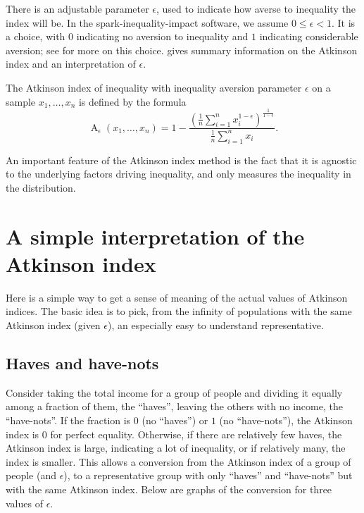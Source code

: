 \documentclass[11pt, oneside]{article}  %
\DeclareMathOperator{\Atkinson}{A}
\begin{document}
There is an adjustable parameter $\epsilon$, used to indicate how averse to inequality the index will be.  In the spark-inequality-impact software, we assume $0 \le \epsilon < 1$.  It is a choice, with $0$ indicating no aversion to inequality and $1$ indicating considerable aversion; see \cite{SaintJacques} for more on this choice.  \cite{AtkinsonWiki} gives summary information on the Atkinson index and an interpretation of $\epsilon$.

The Atkinson index of inequality with inequality aversion parameter \(\epsilon \) on a sample \(x_1, \ldots, x_n\) is defined by the formula
\[ \Atkinson_\epsilon (x_1, \ldots, x_n) = 1 - \frac{(\frac{1}{n}\sum_{i=1}^n x_i^{1-\epsilon})^\frac{1}{1-\epsilon}}{\frac{1}{n}\sum_{i=1}^n x_i}.\]

An important feature of the Atkinson index method is the fact that it is agnostic to the underlying factors driving inequality, and only measures the inequality in the distribution.

\section{A simple interpretation of the Atkinson index}

Here is a simple way to get a sense of meaning of the actual values of Atkinson indices. The basic idea is to pick, from the infinity of populations with the same Atkinson index (given $\epsilon$), an especially easy to understand representative.

\subsection{Haves and have-nots}

Consider taking the total income for a group of people and dividing it equally among a fraction of them, the ``haves'', leaving the others with no income, the ``have-nots''.  If the fraction is $0$ (no ``haves'') or $1$ (no ``have-nots''), the Atkinson index is $0$ for perfect equality.  Otherwise, if there are relatively few haves, the Atkinson index is large, indicating a lot of inequality, or if relatively many, the index is smaller.  This allows a conversion from the Atkinson index of a group of people (and $\epsilon$), to a representative group with only ``haves'' and ``have-nots'' but with the same Atkinson index.  Below are graphs of the conversion for three values of $\epsilon$.
\end{document}
